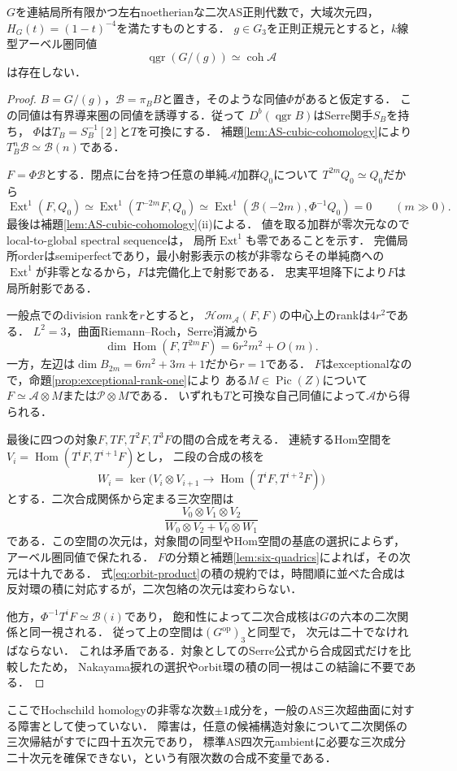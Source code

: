 \begin{theorem}\label{thm:unpointed-graded}
$G$を連結局所有限かつ左右noetherianな二次AS正則代数で，大域次元四，
$H_G(t)=(1-t)^{-4}$を満たすものとする．
$g\in G_3$を正則正規元とすると，$k$線型アーベル圏同値
\[
 \operatorname{qgr}(G/(g))\simeq\operatorname{coh}\mathcal A
\]
は存在しない．
\end{theorem}
\begin{proof}
$B=G/(g)$，$\mathcal B=\pi_B B$と置き，そのような同値$\Phi$があると仮定する．
この同値は有界導来圏の同値を誘導する．従って
$D^b(\operatorname{qgr}B)$はSerre関手$S_B$を持ち，
$\Phi$は$T_B=S_B^{-1}[2]$と$T$を可換にする．
補題\ref{lem:AS-cubic-cohomology}により
$T_B^n\mathcal B\simeq\mathcal B(n)$である．

$F=\Phi\mathcal B$とする．閉点に台を持つ任意の単純$\mathcal A$加群$Q_0$について
$T^{2m}Q_0\simeq Q_0$だから
\[
 \operatorname{Ext}^1(F,Q_0)
 \simeq\operatorname{Ext}^1(T^{-2m}F,Q_0)
 \simeq\operatorname{Ext}^1(\mathcal B(-2m),\Phi^{-1}Q_0)=0
 \qquad(m\gg0).
\]
最後は補題\ref{lem:AS-cubic-cohomology}(ii)による．
値を取る加群が零次元なのでlocal-to-global spectral sequenceは，
局所$\operatorname{Ext}^1$も零であることを示す．
完備局所orderはsemiperfectであり，最小射影表示の核が非零ならその単純商への
$\operatorname{Ext}^1$が非零となるから，$F$は完備化上で射影である．
忠実平坦降下により$F$は局所射影である．

一般点でのdivision rankを$r$とすると，
$\mathcal H om_{\mathcal A}(F,F)$の中心上のrankは$4r^2$である．
$L^2=3$，曲面Riemann--Roch，Serre消滅から
\[
 \dim\operatorname{Hom}(F,T^{2m}F)=6r^2m^2+O(m).
\]
一方，左辺は$\dim B_{2m}=6m^2+3m+1$だから$r=1$である．
$F$はexceptionalなので，命題\ref{prop:exceptional-rank-one}により
ある$M\in\operatorname{Pic}(Z)$について
$F\simeq\mathcal A\otimes M$または$\mathcal P\otimes M$である．
いずれも$T$と可換な自己同値によって$\mathcal A$から得られる．

最後に四つの対象$F,TF,T^2F,T^3F$の間の合成を考える．
連続するHom空間を$V_i=\operatorname{Hom}(T^iF,T^{i+1}F)$とし，
二段の合成の核を
\[
 W_i=\ker\bigl(V_i\otimes V_{i+1}\longrightarrow
 \operatorname{Hom}(T^iF,T^{i+2}F)\bigr)
\]
とする．二次合成関係から定まる三次空間は
\begin{equation}
 \frac{V_0\otimes V_1\otimes V_2}
 {W_0\otimes V_2+V_0\otimes W_1}
 \label{eq:intrinsic-cubic-envelope}
\end{equation}
である．この空間の次元は，対象間の同型やHom空間の基底の選択によらず，
アーベル圏同値で保たれる．
$F$の分類と補題\ref{lem:six-quadrics}によれば，その次元は十九である．
式\eqref{eq:orbit-product}の積の規約では，時間順に並べた合成は
反対環の積に対応するが，二次包絡の次元は変わらない．

他方，$\Phi^{-1}T^iF\simeq\mathcal B(i)$であり，
飽和性によって二次合成核は$G$の六本の二次関係と同一視される．
従って上の空間は$(G^{\mathrm{op}})_3$と同型で，
次元は二十でなければならない．
これは矛盾である．対象としてのSerre公式から合成図式だけを比較したため，
Nakayama捩れの選択やorbit環の積の同一視はこの結論に不要である．
\end{proof}

\begin{remark}
ここでHochschild homologyの非零な次数$\pm1$成分を，一般のAS三次超曲面に対する障害として使っていない．
障害は，任意の候補構造対象について二次関係の三次帰結がすでに四十五次元であり，
標準AS四次元ambientに必要な三次成分二十次元を確保できない，という有限次数の合成不変量である．
\end{remark}
